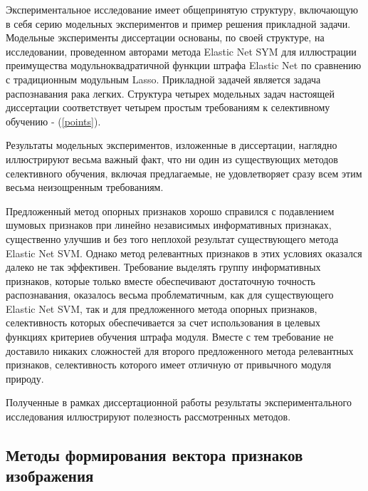 \documentclass[12pt,a4paper]{article}
\begin{document}
Экспериментальное исследование имеет общепринятую структуру, включающую в себя серию модельных экспериментов и пример решения прикладной задачи. Модельные эксперименты диссертации основаны, по своей структуре, на исследовании, проведенном авторами метода Elastic Net SYM для иллюстрации преимущества модульноквадратичной функции штрафа Elastic Net по сравнению с традиционным модульным Lasso. Прикладной задачей является задача распознавания рака легких. Структура четырех модельных задач настоящей диссертации соответствует
четырем простым требованиям к селективному обучению - (\ref{points}).

Результаты модельных экспериментов, изложенные в диссертации, наглядно иллюстрируют весьма важный факт, что ни один из существующих методов селективного обучения, включая предлагаемые, не удовлетворяет сразу всем этим весьма неизощренным требованиям. 

Предложенный метод опорных признаков хорошо справился с подавлением шумовых признаков при линейно независимых информативных признаках, существенно улучшив и без того неплохой результат существующего метода Elastic Net SVM. Однако метод релевантных признаков в этих условиях оказался далеко не так эффективен. Требование выделять группу информативных признаков, которые только вместе обеспечивают достаточную точность распознавания, оказалось весьма проблематичным, как для существующего Elastic Net SVM, так и для предложенного метода
опорных признаков, селективность которых обеспечивается за счет использования в целевых функциях критериев обучения штрафа модуля. Вместе с тем требование не доставило никаких сложностей для второго предложенного метода релевантных признаков, селективность которого имеет отличную от привычного модуля природу.

Полученные в рамках диссертационной работы результаты экспериментального исследования иллюстрируют полезность рассмотренных методов.

\subsection{Методы формирования вектора признаков изображения}
\end{document}
